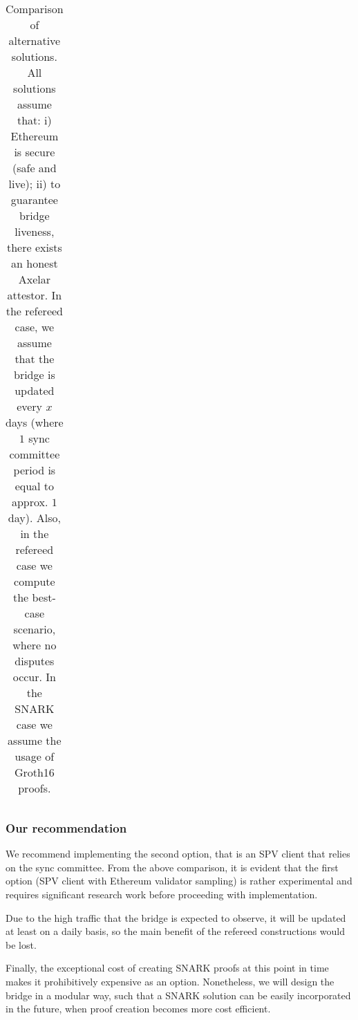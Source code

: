 \begin{table}
{\begin{tabular}{|c|c|c|c|c|c|}
        \hline
    \end{tabular}
    }
    \caption{Comparison of alternative solutions. All solutions assume that: i)
    Ethereum is secure (safe and live); ii) to guarantee bridge liveness, there
    exists an honest Axelar attestor. In the refereed case, we assume that the
    bridge is updated every $x$ days (where $1$ sync committee period is equal
    to approx. $1$ day). Also, in the refereed case we compute the best-case
    scenario, where no disputes occur. In the SNARK case we assume the usage of
    Groth16 proofs.}
    \label{tab:comparison}
\end{table}

\subsubsection*{Our recommendation}
We recommend implementing the second option, that is an SPV client that relies
on the sync committee. From the above comparison, it is evident that the
first option (SPV client with Ethereum validator sampling) is rather
experimental and requires significant research work before proceeding with
implementation.

Due to the high traffic that the bridge is expected to observe, it will 
be updated at least on a daily basis, so the main
benefit of the refereed constructions would be lost.

Finally, the exceptional cost of creating SNARK proofs at this point in time
makes it prohibitively expensive as an option. Nonetheless, we will design the
bridge in a modular way, such that a SNARK solution can be easily incorporated
in the future, when proof creation becomes more cost efficient.
